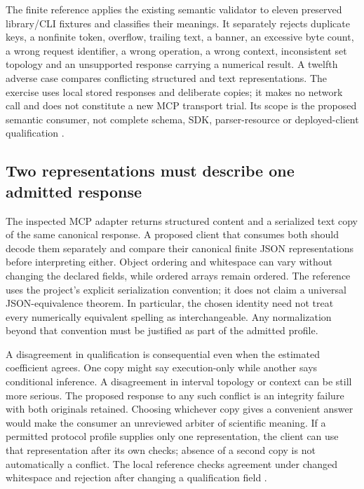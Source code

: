 The finite reference applies the existing semantic validator to eleven
preserved library/CLI fixtures and classifies their meanings. It separately
rejects duplicate keys, a nonfinite token, overflow, trailing text, a banner,
an excessive byte count, a wrong request identifier, a wrong operation,
a wrong context, inconsistent set topology and an unsupported response
carrying a numerical result. A twelfth adverse case compares conflicting
structured and text representations. The exercise uses local stored
responses and deliberate copies; it makes no network call and does not
constitute a new MCP transport trial. Its scope is the proposed semantic
consumer, not complete schema, SDK, parser-resource or deployed-client
qualification \citep{exec17_integration_review_reference}.

\subsection{Two representations must describe one admitted response}

The inspected MCP adapter returns structured content and a serialized text
copy of the same canonical response. A proposed client that consumes both
should decode them separately and compare their canonical finite JSON
representations before interpreting either. Object ordering and whitespace
can vary without changing the declared fields, while ordered arrays remain
ordered. The reference uses the project's explicit serialization convention;
it does not claim a universal JSON-equivalence theorem. In particular, the
chosen identity need not treat every numerically equivalent spelling as
interchangeable. Any normalization beyond that convention must be justified
as part of the admitted profile.

A disagreement in qualification is consequential even when the estimated
coefficient agrees. One copy might say execution-only while another says
conditional inference. A disagreement in interval topology or context can
be still more serious. The proposed response to any such conflict is an
integrity failure with both originals retained. Choosing whichever copy gives
a convenient answer would make the consumer an unreviewed arbiter of
scientific meaning. If a permitted protocol profile supplies only one
representation, the client can use that representation after its own checks;
absence of a second copy is not automatically a conflict. The local reference
checks agreement under changed whitespace and rejection after changing a
qualification field \citep{exec17_integration_review_reference}.

